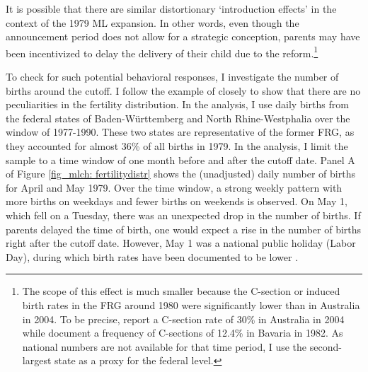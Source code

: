 It is possible that there are similar distortionary `introduction effects' in the context of the 1979 ML expansion. In other words, even though the announcement period does not allow for a strategic conception, parents may have been incentivized to delay the delivery of their child due to the reform.\footnote{The scope of this effect is much smaller because the C-section or induced birth rates in the FRG around 1980 were significantly lower than in Australia in 2004. To be precise, \cite{gans2009born} report a C-section rate of 30\% in Australia in 2004 while \cite{aerzteblatt1988} document a frequency of C-sections of 12.4\% in Bavaria in 1982. As national numbers are not available for that time period, I use the second-largest state as a proxy for the federal level.}


To check for such potential behavioral responses, I investigate the number of births around the cutoff. I follow the example of \cite{gans2009born} closely to show that there are no peculiarities in the fertility distribution. In the analysis, I use daily births from the federal states of Baden-Württemberg and North Rhine-Westphalia over the window of 1977-1990. These two states are representative of the former FRG, as they accounted for almost 36\% of all births in 1979. In the analysis, I limit the sample to a time window of one month before and after the cutoff date. Panel A of Figure \ref{fig_mlch: fertilitydistr} shows the (unadjusted) daily number of births for April and May 1979. Over the time window, a strong weekly pattern with more births on weekdays and fewer births on weekends is observed. On May 1, which fell on a Tuesday, there was an unexpected drop in the number of births. If parents delayed the time of birth, one would expect a rise in the number of births right after the cutoff date. However, May 1 was a national public holiday (Labor Day), during which birth rates have been documented to be lower \citep{neugart2013economic}.


